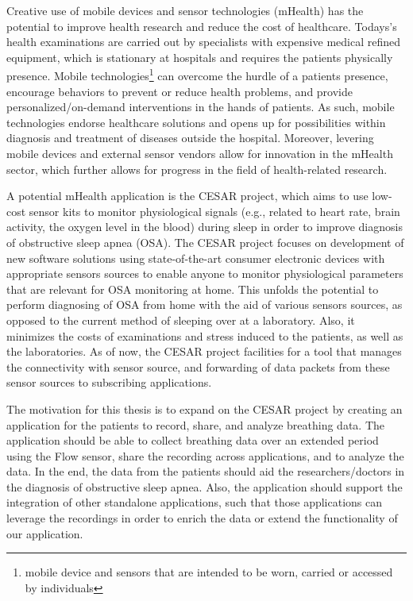 Creative use of mobile devices and sensor technologies (mHealth) has the potential to improve health research and reduce the cost of healthcare. Todays's health examinations are carried out by specialists with expensive medical refined equipment, which is stationary at hospitals and requires the patients physically presence.  Mobile technologies\footnote{mobile device and sensors that are intended to be worn, carried or accessed by individuals} can overcome the hurdle of a patients presence, encourage behaviors to prevent or reduce health problems, and provide personalized/on-demand interventions \cite{kumar2013mobile} in the hands of patients. As such, mobile technologies endorse healthcare solutions and opens up for possibilities within diagnosis and treatment of diseases outside the hospital. Moreover, levering mobile devices and external sensor vendors allow for innovation in the mHealth sector, which further allows for progress in the field of health-related research.   

A potential mHealth application is the CESAR project, which aims to use low-cost sensor kits to monitor physiological signals (e.g., related to heart rate, brain activity, the oxygen level in the blood) during sleep in order to improve diagnosis of obstructive sleep apnea (OSA). The CESAR project \cite{cesar} focuses on development of new software solutions using state-of-the-art consumer electronic devices with appropriate sensors sources to enable anyone to monitor physiological parameters that are relevant for OSA monitoring at home. This unfolds the potential to perform diagnosing of OSA from home with the aid of various sensors sources, as opposed to the current method of sleeping over at a laboratory. Also, it minimizes the costs of examinations and stress induced to the patients, as well as the laboratories. As of now, the CESAR project facilities for a tool that manages the connectivity with sensor source, and forwarding of data packets from these sensor sources to subscribing applications. 

The motivation for this thesis is to expand on the CESAR project by creating an application for the patients to record, share, and analyze breathing data. The application should be able to collect breathing data over an extended period using the Flow sensor, share the recording across applications, and to analyze the data. In the end, the data from the patients should aid the researchers/doctors in the diagnosis of obstructive sleep apnea. Also, the application should support the integration of other standalone applications, such that those applications can leverage the recordings in order to enrich the data or extend the functionality of our application.  